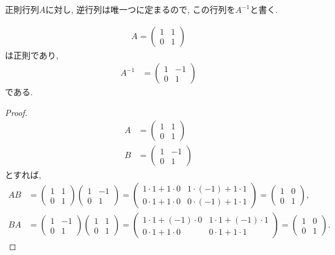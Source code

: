 \begin{remark}
  正則行列$A$に対し,
  逆行列は唯一つに定まるので,
  この行列を$A^{-1}$と書く.
\end{remark}


\begin{example}
  \begin{align*}
    A=\begin{pmatrix}1&1\\0&1\end{pmatrix}
  \end{align*}
  は正則であり,
  \begin{align*}
    A^{-1}&=\begin{pmatrix}1&-1\\0&1\end{pmatrix}
  \end{align*}
  である.
\end{example}
\begin{proof}
  \begin{align*}
    A&=\begin{pmatrix}1&1\\0&1\end{pmatrix}\\
    B&=\begin{pmatrix}1&-1\\0&1\end{pmatrix}
  \end{align*}
  とすれば,
  \begin{align*}
    AB&=\begin{pmatrix}1&1\\0&1\end{pmatrix}\begin{pmatrix}1&-1\\0&1\end{pmatrix}
      =\begin{pmatrix}1\cdot 1+1\cdot 0&1\cdot(-1)+1\cdot 1\\0\cdot 1+1\cdot 0&0\cdot(-1)+1\cdot 1\end{pmatrix}
      =\begin{pmatrix}1&0\\0&1\end{pmatrix},\\
      BA&=\begin{pmatrix}1&-1\\0&1\end{pmatrix}\begin{pmatrix}1&1\\0&1\end{pmatrix}
        =\begin{pmatrix}1\cdot 1+(-1)\cdot 0&1\cdot 1+(-1)\cdot 1\\0\cdot 1+1\cdot 0&0\cdot 1+1\cdot 1\end{pmatrix}
        =\begin{pmatrix}1&0\\0&1\end{pmatrix}.
  \end{align*}
\end{proof}
